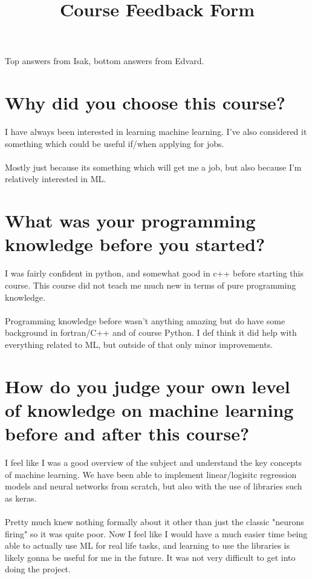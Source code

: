 \documentclass[12pt]{article}
\title{Course Feedback Form}
\author{}
\date{}
\begin{document}
	
	\maketitle
	
	Top answers from Isak, bottom answers from Edvard.
	
	\section*{Why did you choose this course?}
	\noindent
	I have always been interested in learning machine learning. I've also considered it something which could be useful if/when applying for jobs.
	\\\\
	Mostly just because its something which will get me a job, but also because I'm relatively interested in ML.
	
	\vspace{2cm}
	
	\section*{What was your programming knowledge before you started?}
	I was fairly confident in python, and somewhat good in c++ before starting this course. This course did not teach me much new in terms of pure programming knowledge.
	\\\\
	Programming knowledge before wasn't anything amazing but do have some background in fortran/C++ and of course Python. I def think it did help with everything related to ML, but outside of that only minor improvements. 
	
	\vspace{2cm}
	
	\section*{How do you judge your own level of knowledge on machine learning before and after this course?}
	I feel like I was a good overview of the subject and understand the key concepts of machine learning. We have been able to implement linear/logisitc regression models and neural networks from scratch, but also with the use of libraries such as keras. 
	\\\\
	Pretty much knew nothing formally about it other than just the classic "neurons firing" so it was quite poor. Now I feel like I would have a much easier time being able to actually use ML for real life tasks, and learning to use the libraries is likely gonna be useful for me in the future. It was not very difficult to get into doing the project.
	
\end{document}
